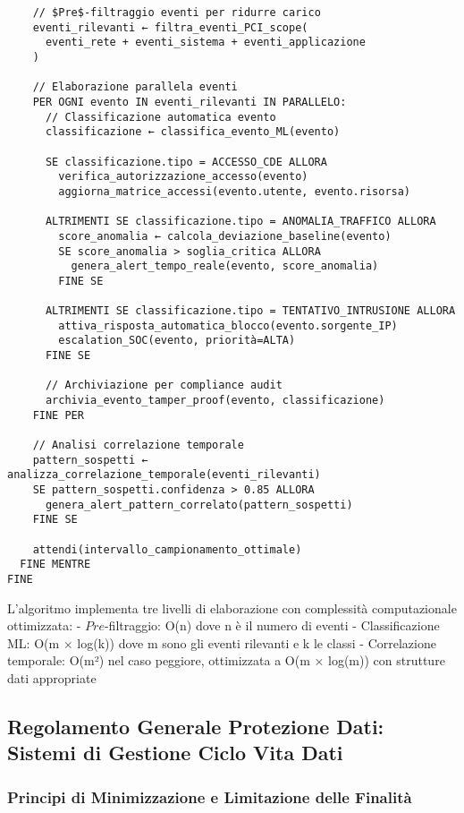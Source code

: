 {\begin{verbatim}
    // $Pre$-filtraggio eventi per ridurre carico
    eventi_rilevanti ← filtra_eventi_PCI_scope(
      eventi_rete + eventi_sistema + eventi_applicazione
    )
    
    // Elaborazione parallela eventi
    PER OGNI evento IN eventi_rilevanti IN PARALLELO:
      // Classificazione automatica evento
      classificazione ← classifica_evento_ML(evento)
      
      SE classificazione.tipo = ACCESSO_CDE ALLORA
        verifica_autorizzazione_accesso(evento)
        aggiorna_matrice_accessi(evento.utente, evento.risorsa)
      
      ALTRIMENTI SE classificazione.tipo = ANOMALIA_TRAFFICO ALLORA
        score_anomalia ← calcola_deviazione_baseline(evento)
        SE score_anomalia > soglia_critica ALLORA
          genera_alert_tempo_reale(evento, score_anomalia)
        FINE SE
      
      ALTRIMENTI SE classificazione.tipo = TENTATIVO_INTRUSIONE ALLORA
        attiva_risposta_automatica_blocco(evento.sorgente_IP)
        escalation_SOC(evento, priorità=ALTA)
      FINE SE
      
      // Archiviazione per compliance audit
      archivia_evento_tamper_proof(evento, classificazione)
    FINE PER
    
    // Analisi correlazione temporale
    pattern_sospetti ← analizza_correlazione_temporale(eventi_rilevanti)
    SE pattern_sospetti.confidenza > 0.85 ALLORA
      genera_alert_pattern_correlato(pattern_sospetti)
    FINE SE
    
    attendi(intervallo_campionamento_ottimale)
  FINE MENTRE
FINE
\end{verbatim}

L'algoritmo implementa tre livelli di elaborazione con complessità computazionale ottimizzata:
- $Pre$-filtraggio: O(n) dove n è il numero di eventi
- Classificazione ML: O(m × log(k)) dove m sono gli eventi rilevanti e k le classi
- Correlazione temporale: O(m²) nel caso peggiore, ottimizzata a O(m × log(m)) con strutture dati appropriate

\subsection{Regolamento Generale Protezione Dati: Sistemi di Gestione Ciclo Vita Dati}

\subsubsection{Principi di Minimizzazione e Limitazione delle Finalità}

}
